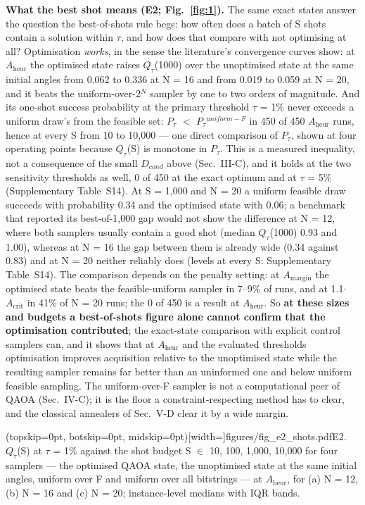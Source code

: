 \documentclass{ieeeaccess}
\begin{document}
\textbf{What the best shot means (E2; Fig.~\ref{fig:1}).} The same exact states answer the question the best-of-shots rule begs: how often does a batch of S shots contain a solution within $\tau$, and how does that compare with not optimising at all? Optimisation \textit{works}, in the sense the literature's convergence curves show: at $A_{\mathrm{heur}}$ the optimised state raises $Q_{\tau}$(1000) over the unoptimised state at the same initial angles from 0.062 to 0.336 at N = 16 and from 0.019 to 0.059 at N = 20, and it beats the uniform-over-2$^{N}$ sampler by one to two orders of magnitude. And its one-shot success probability at the primary threshold $\tau$ = 1\% never exceeds a uniform draw's from the feasible set: $P_{\tau}$ $<$ $P_{\tau}$$^{uniform-F}$ in 450 of 450 $A_{\mathrm{heur}}$ runs, hence at every S from 10 to 10,000 --- one direct comparison of $P_{\tau}$, shown at four operating points because $Q_{\tau}$(S) is monotone in $P_{\tau}$. This is a measured inequality, not a consequence of the small $D_{cond}$ above (Sec.~III-C), and it holds at the two sensitivity thresholds as well, 0 of 450 at the exact optimum and at $\tau$ = 5\% (Supplementary Table~S14). At S = 1,000 and N = 20 a uniform feasible draw succeeds with probability 0.34 and the optimised state with 0.06; a benchmark that reported its best-of-1,000 gap would not show the difference at N = 12, where both samplers usually contain a good shot (median $Q_{\tau}$(1000) 0.93 and 1.00), whereas at N = 16 the gap between them is already wide (0.34 against 0.83) and at N = 20 neither reliably does (levels at every S: Supplementary Table~S14). The comparison depends on the penalty setting: at $A_{\mathrm{margin}}$ the optimised state beats the feasible-uniform sampler in 7--9\% of runs, and at 1.1$\cdot$$A_{\mathrm{crit}}$ in 41\% of N = 20 runs; the 0 of 450 is a result at $A_{\mathrm{heur}}$. So \textbf{at these sizes and budgets a best-of-shots figure alone cannot confirm that the optimisation contributed}; the exact-state comparison with explicit control samplers can, and it shows that at $A_{\mathrm{heur}}$ and the evaluated thresholds optimisation improves acquisition relative to the unoptimised state while the resulting sampler remains far better than an uninformed one and below uniform feasible sampling. The uniform-over-F sampler is not a computational peer of QAOA (Sec.~IV-C); it is the floor a constraint-respecting method has to clear, and the classical annealers of Sec.~V-D clear it by a wide margin.

\Figure[!t](topskip=0pt, botskip=0pt, midskip=0pt)[width=\textwidth]{figures/fig_e2_shots.pdf}{E2. $Q_{\tau}$(S) at $\tau$ = 1\% against the shot budget   S $\in$ {10, 100, 1,000, 10,000} for four samplers --- the optimised QAOA state, the unoptimised state   at the same initial angles, uniform over F and uniform over all bitstrings --- at $A_{\mathrm{heur}}$, for   (a) N = 12, (b) N = 16 and (c) N = 20; instance-level medians with IQR bands.\label{fig:1}}
\end{document}
